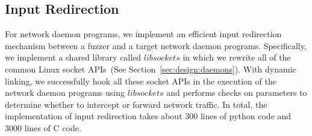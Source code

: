 \subsection{Input Redirection}
For network daemon programs, we implement an efficient input redirection mechanism between a fuzzer and a target network daemon programs. Specifically, we implement a shared library called $libsockets$ in which we rewrite all of the common Linux socket APIs~(See Section~\ref{sec:design:daemons}). With dynamic linking, we successfully hook all these socket APIs in the execution of the network daemon programs using $libsockets$ and performs checks on parameters to determine whether to intercept or forward network traffic.  In total, the implementation of input redirection takes about 300 lines of python code and 3000 lines of C code.


